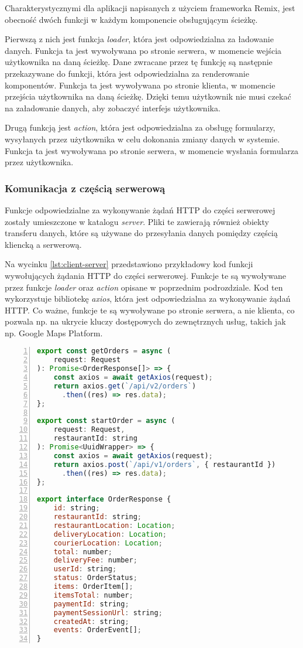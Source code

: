 Charakterystycznymi dla aplikacji napisanych z użyciem frameworka Remix, jest obecność dwóch funkcji w każdym komponencie obsługującym ścieżkę. 

Pierwszą z nich jest funkcja \textit{loader}, która jest odpowiedzialna za ładowanie danych. Funkcja ta jest wywoływana po stronie serwera, w momencie wejścia użytkownika na daną ścieżkę. Dane zwracane przez tę funkcję są następnie przekazywane do funkcji, która jest odpowiedzialna za renderowanie komponentów. Funkcja ta jest wywoływana po stronie klienta, w momencie przejścia użytkownika na daną ścieżkę. Dzięki temu użytkownik nie musi czekać na załadowanie danych, aby zobaczyć interfejs użytkownika. 

Drugą funkcją jest \textit{action}, która jest odpowiedzialna za obsługę formularzy, wysyłanych przez użytkownika w celu dokonania zmiany danych w systemie. Funkcja ta jest wywoływana po stronie serwera, w momencie wysłania formularza przez użytkownika.

\subsubsection{Komunikacja z częścią serwerową}

Funkcje odpowiedzialne za wykonywanie żądań HTTP do części serwerowej zostały umieszczone w katalogu \textit{server}. Pliki te zawierają również obiekty transferu danych, które są używane do przesyłania danych pomiędzy częścią kliencką a serwerową.

Na wycinku \ref{lst:client-server} przedstawiono przykładowy kod funkcji wywołujących żądania HTTP do części serwerowej. Funkcje te są wywoływane przez funkcje \textit{loader} oraz \textit{action} opisane w poprzednim podrozdziale. Kod ten wykorzystuje bibliotekę \textit{axios}, która jest odpowiedzialna za wykonywanie żądań HTTP. Co ważne, funkcje te są wywoływane po stronie serwera, a nie klienta, co pozwala np. na ukrycie kluczy dostępowych do zewnętrznych usług, takich jak np. Google Maps Platform.

\begin{lstlisting}[caption={Kod funkcji wywołujących żadania HTTP do części serwerowej},label={lst:client-server},captionpos=b,language=JavaScript,numbers=left,showstringspaces=false]
export const getOrders = async (
    request: Request
): Promise<OrderResponse[]> => {
    const axios = await getAxios(request);
    return axios.get(`/api/v2/orders`)
      .then((res) => res.data);
};
  
export const startOrder = async (
    request: Request,
    restaurantId: string
): Promise<UuidWrapper> => {
    const axios = await getAxios(request);
    return axios.post(`/api/v1/orders`, { restaurantId })
      .then((res) => res.data);
};

export interface OrderResponse {
    id: string;
    restaurantId: string;
    restaurantLocation: Location;
    deliveryLocation: Location;
    courierLocation: Location;
    total: number;
    deliveryFee: number;
    userId: string;
    status: OrderStatus;
    items: OrderItem[];
    itemsTotal: number;
    paymentId: string;
    paymentSessionUrl: string;
    createdAt: string;
    events: OrderEvent[];
}
\end{lstlisting}


